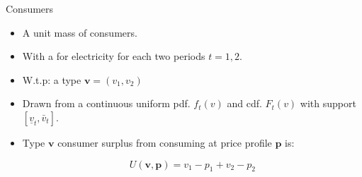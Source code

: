 \documentclass{class}
\begin{document}

\begin{frame}{Consumers}

\begin{itemize}
    \item A unit mass of consumers.

\vfill

    \item With a  for electricity for each two periods $t = 1,2$.

\vfill

    \item W.t.p: a  type $\textbf{v}=(v_1,v_2) $
    
\vfill

 \item Drawn from a continuous uniform pdf. $f_t(v)$ and cdf. $F_t(v)$ with support $[\underline{v}_t,\bar{v}_t]$. 
            





\vfill

\item Type $\textbf{v}$ consumer surplus from consuming at price profile $\textbf{p}$ is:

\begin{equation*}
 U\left(\textbf{v},\textbf{p}\right)= v_1-p_1 +  v_2-p_2
 \end{equation*}
\end{itemize}    
\end{frame}

\end{document}
